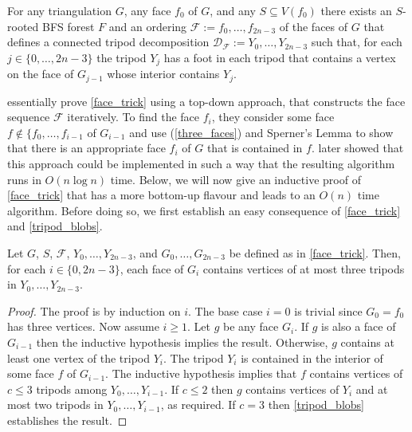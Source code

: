 \documentclass{patmorin}
\begin{document}
\begin{lem}\label{face_trick}
  For any triangulation $G$, any face $f_0$ of $G$, and any $S\subseteq V(f_0)$ there exists an $S$-rooted BFS forest $F$ and an ordering $\mathcal{F}:=f_0,\ldots,f_{2n-3}$ of the faces of $G$ that defines a connected tripod decomposition $\mathcal{D}_\mathcal{F}:=Y_0,\ldots,Y_{2n-3}$ such that, for each $j\in\{0,\ldots,2n-3\}$ the tripod $Y_j$ has a foot in each tripod that contains a vertex on the face of $G_{j-1}$ whose interior  contains $Y_j$.
\end{lem}

\citet{dujmovic.joret.ea:planar} essentially prove \cref{face_trick} using a top-down approach, that constructs the face sequence $\mathcal{F}$ iteratively.  To find the face $f_i$, they consider some face $f\not\in\{f_0,\ldots,f_{i-1}$ of $G_{i-1}$ and use (\ref{three_faces}) and Sperner's Lemma to show that there is an appropriate face $f_i$ of $G$ that is contained in $f$.  \citet{morin:fast} later showed that this approach could be implemented in such a way that the resulting algorithm runs in $O(n\log n)$ time.  Below, we will now give an inductive proof of \cref{face_trick} that has a more bottom-up flavour and leads to an $O(n)$ time algorithm.   Before doing so, we first establish an easy consequence of \cref{face_trick} and \cref{tripod_blobs}.

\begin{lem}
  Let $G$, $S$, $\mathcal{F}$, $Y_0,\ldots,Y_{2n-3}$, and $G_0,\ldots,G_{2n-3}$ be defined as in \cref{face_trick}. Then, for each $i\in\{0,2n-3\}$, each face of $G_i$ contains vertices of at most three tripods in $Y_0,\ldots,Y_{2n-3}$.
\end{lem}

\begin{proof}
  The proof is by induction on $i$.  The base case $i=0$ is trivial since $G_0=f_0$ has three vertices.  Now assume $i\ge 1$. Let $g$ be any face $G_i$.  If $g$ is also a face of $G_{i-1}$ then the inductive hypothesis implies the result.  Otherwise, $g$ contains at least one vertex of the tripod $Y_i$.  The tripod $Y_i$ is contained in the interior of some face $f$ of $G_{i-1}$.  The inductive hypothesis implies that $f$ contains vertices of $c\le 3$ tripods among $Y_{0},\ldots,Y_{i-1}$.  If $c\le 2$ then $g$ contains vertices of $Y_i$ and at most two tripods in $Y_0,\ldots,Y_{i-1}$, as required.  If $c=3$ then \cref{tripod_blobs} establishes the result.
\end{proof}
\end{document}
